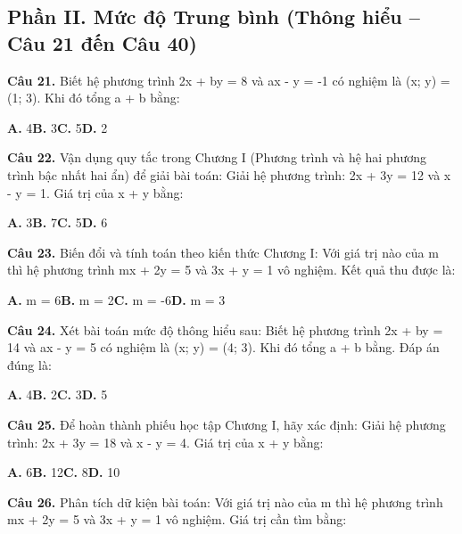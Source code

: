 \documentclass[11pt,a4paper]{article}
\begin{document}
\subsection*{\color{accent} Phần II. Mức độ Trung bình (Thông hiểu -- Câu 21 đến Câu 40)}
\textbf{\color{primary} Câu 21.} Biết hệ phương trình 2x + by = 8 và ax - y = -1 có nghiệm là (x; y) = (1; 3). Khi đó tổng a + b bằng:\par
\hspace*{1.5em}\textbf{A.} 4\quad\quad \textbf{B.} 3\quad\quad \textbf{C.} 5\quad\quad \textbf{D.} 2\par\vspace{2pt}
\textbf{\color{primary} Câu 22.} Vận dụng quy tắc trong Chương I (Phương trình và hệ hai phương trình bậc nhất hai ẩn) để giải bài toán: Giải hệ phương trình: 2x + 3y = 12 và x - y = 1. Giá trị của x + y bằng:\par
\hspace*{1.5em}\textbf{A.} 3\quad\quad \textbf{B.} 7\quad\quad \textbf{C.} 5\quad\quad \textbf{D.} 6\par\vspace{2pt}
\textbf{\color{primary} Câu 23.} Biến đổi và tính toán theo kiến thức Chương I: Với giá trị nào của m thì hệ phương trình mx + 2y = 5 và 3x + y = 1 vô nghiệm. Kết quả thu được là:\par
\hspace*{1.5em}\textbf{A.} m = 6\quad\quad \textbf{B.} m = 2\quad\quad \textbf{C.} m = -6\quad\quad \textbf{D.} m = 3\par\vspace{2pt}
\textbf{\color{primary} Câu 24.} Xét bài toán mức độ thông hiểu sau: Biết hệ phương trình 2x + by = 14 và ax - y = 5 có nghiệm là (x; y) = (4; 3). Khi đó tổng a + b bằng. Đáp án đúng là:\par
\hspace*{1.5em}\textbf{A.} 4\quad\quad \textbf{B.} 2\quad\quad \textbf{C.} 3\quad\quad \textbf{D.} 5\par\vspace{2pt}
\textbf{\color{primary} Câu 25.} Để hoàn thành phiếu học tập Chương I, hãy xác định: Giải hệ phương trình: 2x + 3y = 18 và x - y = 4. Giá trị của x + y bằng:\par
\hspace*{1.5em}\textbf{A.} 6\quad\quad \textbf{B.} 12\quad\quad \textbf{C.} 8\quad\quad \textbf{D.} 10\par\vspace{2pt}
\textbf{\color{primary} Câu 26.} Phân tích dữ kiện bài toán: Với giá trị nào của m thì hệ phương trình mx + 2y = 5 và 3x + y = 1 vô nghiệm. Giá trị cần tìm bằng:\par
\end{document}
